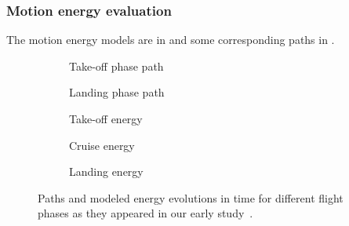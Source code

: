 \subsubsection*{Motion energy evaluation}

The motion energy models are in  and some corresponding paths in .
\begin{figure}[h!]
  \centering
  \selectfont
  \footnotesize
  \begin{subfigure}[c]{0.475\textwidth}
    \centering
    
    \caption{Take-off phase path}
    \label{fig:takeoff-path}
    \vspace{1.4ex}
  \end{subfigure}
  \begin{subfigure}[c]{0.475\textwidth}
    \centering
    
    \vspace*{3ex}
    \caption{Landing phase path}
    \label{fig:landing-path}
    \vspace{1.4ex}
  \end{subfigure}
  \quad
  \begin{subfigure}[t]{0.35\textwidth}
    \centering
    
    \caption{Take-off energy}
    \label{fig:takeoff-energy}
  \end{subfigure}
  \begin{subfigure}[t]{0.31\textwidth}
    \centering
    
    \caption{Cruise energy}
    \label{fig:cruise-energy}
  \end{subfigure}
  \begin{subfigure}[t]{0.30\textwidth}
    \centering
    
    \caption{Landing energy}
    \label{fig:landing-energy}
  \end{subfigure}
  \caption[Paths and modeled energy evolutions in time for different flight phases]{Paths and modeled energy evolutions in time for different flight phases as they appeared in our early study~\citep{seewald2020mechanical}.}
  \label{fig:path-energy}
\end{figure}
